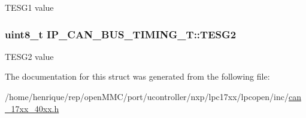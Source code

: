 T\-E\-S\-G1 value \hypertarget{structIP__CAN__BUS__TIMING__T_a67805cda8a3bb4be441ac2ebd25ed3a7}{
\subsubsection[{T\-E\-S\-G2}]{\setlength{\rightskip}{0pt plus 5cm}uint8\-\_\-t I\-P\-\_\-\-C\-A\-N\-\_\-\-B\-U\-S\-\_\-\-T\-I\-M\-I\-N\-G\-\_\-\-T\-::\-T\-E\-S\-G2}}\label{structIP__CAN__BUS__TIMING__T_a67805cda8a3bb4be441ac2ebd25ed3a7}
T\-E\-S\-G2 value 

The documentation for this struct was generated from the following file\-:\begin{DoxyCompactItemize}
\item 
/home/henrique/rep/open\-M\-M\-C/port/ucontroller/nxp/lpc17xx/lpcopen/inc/\hyperlink{can__17xx__40xx_8h}{can\-\_\-17xx\-\_\-40xx.\-h}\end{DoxyCompactItemize}
